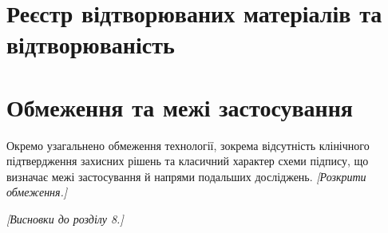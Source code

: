 \section{Реєстр відтворюваних матеріалів та відтворюваність}
\label{sec:artifact-index}

\section{Обмеження та межі застосування}
\label{sec:limitations}
Окремо узагальнено обмеження технології, зокрема відсутність клінічного підтвердження захисних рішень та класичний характер схеми підпису, що визначає межі застосування й напрями подальших досліджень. \emph{[Розкрити обмеження.]}

\emph{[Висновки до розділу 8.]}
